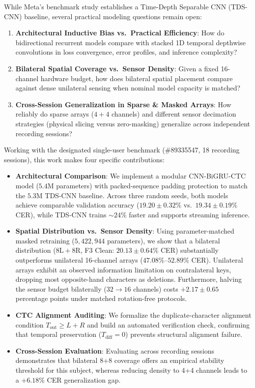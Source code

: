 \documentclass{article}
\begin{document}
While Meta's benchmark study \citep{sivakumar2024emg2qwerty} establishes a Time-Depth Separable CNN (TDS-CNN) baseline, several practical modeling questions remain open:
\begin{enumerate}
    \item \textbf{Architectural Inductive Bias vs.\ Practical Efficiency}: How do bidirectional recurrent models compare with stacked 1D temporal depthwise convolutions in loss convergence, error profiles, and inference complexity?
    \item \textbf{Bilateral Spatial Coverage vs.\ Sensor Density}: Given a fixed 16-channel hardware budget, how does bilateral spatial placement compare against dense unilateral sensing when nominal model capacity is matched?
    \item \textbf{Cross-Session Generalization in Sparse \& Masked Arrays}: How reliably do sparse arrays ($4+4$ channels) and different sensor decimation strategies (physical slicing versus zero-masking) generalize across independent recording sessions?
\end{enumerate}

Working with the designated single-user benchmark (\#89335547, 18 recording sessions), this work makes four specific contributions:
\begin{itemize}
    \item \textbf{Architectural Comparison}: We implement a modular CNN-BiGRU-CTC model ($5.4\text{M}$ parameters) with packed-sequence padding protection to match the $5.3\text{M}$ TDS-CNN baseline. Across three random seeds, both models achieve comparable validation accuracy ($19.20 \pm 0.32\%$ vs.\ $19.34 \pm 0.19\%$ CER), while TDS-CNN trains $\sim 24\%$ faster and supports streaming inference.
    \item \textbf{Spatial Distribution vs.\ Sensor Density}: Using parameter-matched masked retraining ($5{,}422{,}944$ parameters), we show that a bilateral distribution ($8\text{L}+8\text{R}$, F3 Clean: $20.13 \pm 0.64\%$ CER) substantially outperforms unilateral 16-channel arrays ($47.08\%$--$52.89\%$ CER). Unilateral arrays exhibit an observed information limitation on contralateral keys, dropping most opposite-hand characters as deletions. Furthermore, halving the sensor budget bilaterally ($32 \to 16$ channels) costs $+2.17 \pm 0.65$ percentage points under matched rotation-free protocols.
    \item \textbf{CTC Alignment Auditing}: We formalize the duplicate-character alignment condition $T_{\text{out}} \ge L + R$ and build an automated verification check, confirming that temporal preservation ($T_{\text{diff}} = 0$) prevents structural alignment failure.
    \item \textbf{Cross-Session Evaluation}: Evaluating across recording sessions demonstrates that bilateral 8+8 coverage offers an empirical stability threshold for this subject, whereas reducing density to 4+4 channels leads to a $+6.18\%$ CER generalization gap.
\end{itemize}
\end{document}
